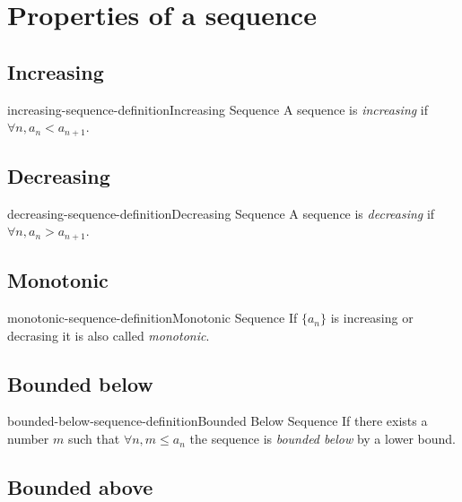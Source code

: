 \documentclass[preview]{standalone}
\begin{document}
\section{Properties of a sequence}

\subsection{Increasing}

\begin{snippetdefinition}{increasing-sequence-definition}{Increasing Sequence}{
    A sequence is \textit{increasing} if \(\forall n, a_n<a_{n+1}\).
}
\end{snippetdefinition}

\subsection{Decreasing}

\begin{snippetdefinition}{decreasing-sequence-definition}{Decreasing Sequence}{
    A sequence is \textit{decreasing} if \(\forall n, a_n>a_{n+1}\).
}
\end{snippetdefinition}

\subsection{Monotonic}

\begin{snippetdefinition}{monotonic-sequence-definition}{Monotonic Sequence}{
    If \(\{a_n\}\) is increasing or decrasing it is also called \textit{monotonic}.
}
\end{snippetdefinition}

\subsection{Bounded below}

\begin{snippetdefinition}{bounded-below-sequence-definition}{Bounded Below Sequence}{
    If there exists a number \(m\) such that \(\forall n, m \leq a_n\)
    the sequence is \textit{bounded below} by a lower bound.
}
\end{snippetdefinition}

\subsection{Bounded above}
\end{document}
